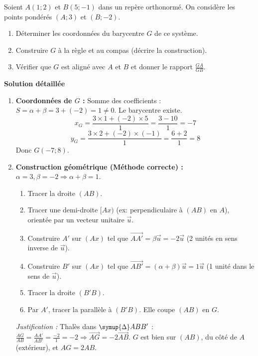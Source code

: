 \documentclass[11pt]{article}
\def\triangle{\mathord{\scalebox{0.9}{$\symup{\Delta}$}}}%
\begin{document}
\begin{exoresolu}
Soient $A(1;2)$ et $B(5;-1)$ dans un repère orthonormé. On considère les points pondérés $(A; 3)$ et $(B; -2)$.
\begin{enumerate}
    \item Déterminer les coordonnées du barycentre $G$ de ce système.
    \item Construire $G$ à la règle et au compas (décrire la construction).
    \item Vérifier que $G$ est aligné avec $A$ et $B$ et donner le rapport $\frac{GA}{GB}$.
\end{enumerate}
\tcblower
\textbf{Solution détaillée}
\begin{enumerate}
    \item \textbf{Coordonnées de $G$ :}
    Somme des coefficients : $S = \alpha+\beta = 3 + (-2) = 1 \neq 0$. Le barycentre existe.
    \[
    x_G = \frac{3 \times 1 + (-2) \times 5}{1} = \frac{3 - 10}{1} = -7
    \]
    \[
    y_G = \frac{3 \times 2 + (-2) \times (-1)}{1} = \frac{6 + 2}{1} = 8
    \]
    Donc \textbf{$G(-7; 8)$}.
    
    \item \textbf{Construction géométrique (Méthode correcte) :}
    $\alpha=3, \beta=-2 \Rightarrow \alpha+\beta=1$.
    \begin{enumerate}
        \item Tracer la droite $(AB)$.
        \item Tracer une demi-droite $[Ax)$ (ex: perpendiculaire à $(AB)$ en $A$), orientée par un vecteur unitaire $\vec{u}$.
        \item Construire $A'$ sur $(Ax)$ tel que $\overrightarrow{AA'} = \beta \vec{u} = -2\vec{u}$ (2 unités en sens inverse de $\vec{u}$).
        \item Construire $B'$ sur $(Ax)$ tel que $\overrightarrow{AB'} = (\alpha+\beta)\vec{u} = 1\vec{u}$ (1 unité dans le sens de $\vec{u}$).
        \item Tracer la droite $(B'B)$.
        \item Par $A'$, tracer la parallèle à $(B'B)$. Elle coupe $(AB)$ en $G$.
    \end{enumerate}
    \emph{Justification :} Thalès dans $\triangle ABB'$ : $\frac{AG}{AB} = \frac{AA'}{AB'} = \frac{-2}{1} = -2 \Rightarrow \overrightarrow{AG} = -2\overrightarrow{AB}$. $G$ est bien sur $(AB)$, du côté de $A$ (extérieur), et $AG = 2 AB$.
    

\end{enumerate}
\end{exoresolu}
\end{document}
